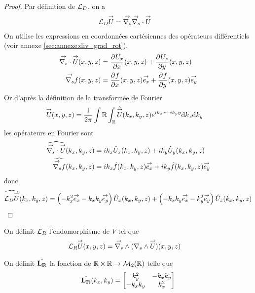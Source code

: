     \begin{proof}
      Par définition de \(\LD\), on a
      \begin{align*}
        \LD \vect{U} & = \vgrads{} \vdivs{} \vect{U}
      \end{align*}
      On utilise les expressions en coordonnées cartésiennes des opérateurs différentiels (voir annexe \ref{sec:annexe:div_grad_rot}).
      \begin{align*}
        \vdivs{\vect{U}}(x,y,z) &= \ddr{x}{U_x}(x,y,z) + \ddr{y}{U_z}(x,y,z)
        \\
        \vgrads{f}(x,y,z) &= \ddr{x}{f}(x,y,z)\vect{e_x} + \ddr{y}{f}(x,y,z)\vect{e_y}
      \end{align*}
      Or d’après la définition de la transformée de Fourier
      \begin{align*}
        \vect{U}(x,y,z) & = \frac{1}{2\pi} \int\RR \int_\RR \hat{\vect{U}}(k_x,k_y,z)e^{ik_xx + ik_yy}\dd{k_x}\dd{k_y}
      \end{align*}
      les opérateurs en Fourier sont
      \begin{align*}
        \widehat{\vdivs{\vect{U}}}(k_x,k_y,z) &= ik_x{\hat{U}_x}(k_x,k_y,z) + ik_y{\hat{U}_y}(k_x,k_y,z)
        \\
        \widehat{\vgrads{f}}(k_x,k_y,z) &= ik_x\hat{f}(k_x,k_y,z)\vect{e_x} + ik_y\hat{f}(k_x,k_y,z)\vect{e_y}
      \end{align*}
      donc
      \begin{align*}
        \widehat{\LD{\vect{U}}}(k_x,k_y,z) =  \left(-k_x^2\vect{e_x} -k_xk_y\vect{e_y}\right){\hat{U}_x}(k_x,k_y,z) + \left(-k_xk_y\vect{e_x} - {k_y^2}\vect{e_y}\right){\hat{U}_z}(k_x,k_y,z)
      \end{align*}

    \end{proof}


    \begin{defn}
      \label{eq:plan:fourier:LR}

      On définit \(\LR\) l'endomorphisme de \(V\) tel que
      \begin{align*}
        \LR \vect{U}(x,y,z) & = \vrots{} (\rots{} \vect{U})(x,y,z)
      \end{align*}

      On définit \(\hat{\mLR}\) la fonction de \(\RR\times\RR \rightarrow \mathcal{M}_2(\RR)\) telle que
      \begin{equation*}
        \hat{\mLR}(k_x,k_y) = 
        \begin{bmatrix}
          k_y^2 & -k_xk_y
          \\
          -k_xk_y & k_x^2
        \end{bmatrix}
      \end{equation*}
    \end{defn}

